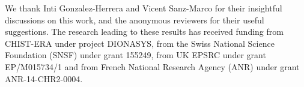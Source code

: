 \documentclass[10pt, conference]{IEEEtran}
\begin{document}
We thank Inti Gonzalez-Herrera and Vicent Sanz-Marco for their insightful discussions on this work, and  the anonymous reviewers for their useful suggestions.
The research leading to these results has received funding from CHIST-ERA under project DIONASYS, from the Swiss National Science Foundation (SNSF) under grant 155249, from UK EPSRC under grant EP/M015734/1 and from French National Research Agency (ANR) under grant ANR-14-CHR2-0004.


% 



\end{document}
